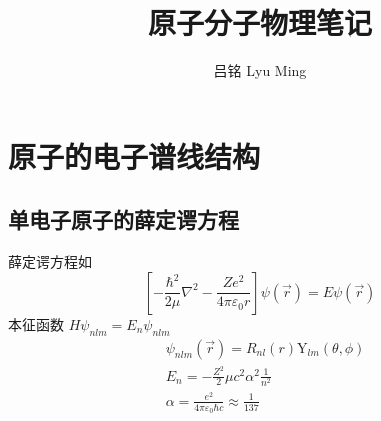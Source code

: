 \documentclass[10pt,a4paper,twocolumn]{article} %
\numberwithin{equation}{section} %
\newcommand\Y{\mathrm{Y}}
\begin{document}
\title{原子分子物理笔记}
\author{吕铭 Lyu Ming}
\maketitle
\tableofcontents
\section{原子的电子谱线结构} %
\label{sec:1st_principle}
\subsection{单电子原子的薛定谔方程} %
\label{sub:single_ele}
薛定谔方程如
\begin{equation}
	\left[-\frac{\hbar^2}{2\mu}\nabla^2 - 
	\frac{Ze^2}{4\pi\varepsilon_0 r}\right]\psi(\vec r)
	= E\psi(\vec r)
\end{equation}
本征函数 $H\psi_{nlm} = E_n\psi_{nlm}$
\begin{align}
	& \psi_{nlm}(\vec r) = R_{nl}(r) \Y_{lm}(\theta,\phi) \\
	& E_n = -\frac{Z^2}{2}\mu c^2\alpha^2\frac 1{n^2} \\
	& \alpha = \frac{e^2}{4\pi\varepsilon_0\hbar c} \approx \frac 1{137}
\end{align}
\end{document}
